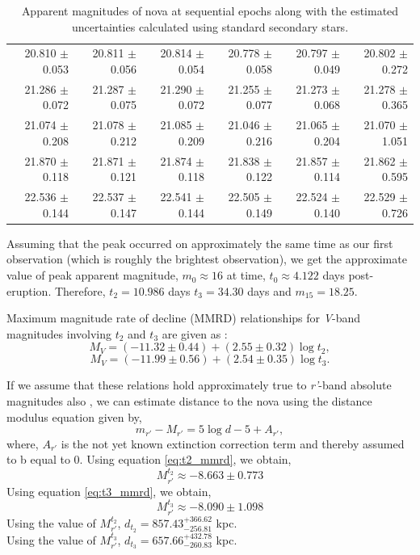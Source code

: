 \documentclass{tda}
\begin{document}
\begin{table}
\begin{tabular} {r r r r r r}
			20.810 \(\pm\) 0.053 & 20.811 \(\pm\) 0.056 & 20.814 \(\pm\) 0.054 & 20.778 \(\pm\) 0.058 & 20.797 \(\pm\) 0.049 & 20.802 \(\pm\) 0.272 \\
			21.286 \(\pm\) 0.072 & 21.287 \(\pm\) 0.075 & 21.290 \(\pm\) 0.072 & 21.255 \(\pm\) 0.077 & 21.273 \(\pm\) 0.068 & 21.278 \(\pm\) 0.365 \\
			21.074 \(\pm\) 0.208 & 21.078 \(\pm\) 0.212 & 21.085 \(\pm\) 0.209 & 21.046 \(\pm\) 0.216 & 21.065 \(\pm\) 0.204 & 21.070 \(\pm\) 1.051 \\
			21.870 \(\pm\) 0.118 & 21.871 \(\pm\) 0.121 & 21.874 \(\pm\) 0.118 & 21.838 \(\pm\) 0.122 & 21.857 \(\pm\) 0.114 & 21.862 \(\pm\) 0.595 \\
			22.536 \(\pm\) 0.144 & 22.537 \(\pm\) 0.147 & 22.541 \(\pm\) 0.144 & 22.505 \(\pm\) 0.149 & 22.524 \(\pm\) 0.140 & 22.529 \(\pm\) 0.726 \\
			\bottomrule
		\end{tabular}
		\caption{Apparent magnitudes of nova at sequential epochs along with the estimated uncertainties calculated using standard secondary stars.}
		\label{table:photometry_nova}
	\end{table}


	Assuming that the peak occurred on approximately the same time as our first observation (which is roughly the brightest observation), we get the approximate value of peak apparent magnitude, \(m_0 \approx 16\) at time, \(t_0 \approx 4.122\) days post-eruption.
	Therefore, \(t_2 = 10.986\) days \(t_3 = 34.30\) days and \(m_{15} = 18.25\).

	Maximum magnitude rate of decline (MMRD) relationships for \textit{V}-band magnitudes involving \(t_2\) and \(t_3\) are given as \citep{2000AJ....120.2007D}:
	\begin{equation}
		M_V = (-11.32 \pm 0.44) + (2.55 \pm 0.32) \log t_2 ,
		\label{eq:t2_mmrd}
	\end{equation}
	\begin{equation}
		M_V = (-11.99 \pm 0.56) + (2.54 \pm 0.35) \log t_3.
		\label{eq:t3_mmrd}
	\end{equation}

	If we assume that these relations hold approximately true to \textit{r'}-band absolute magnitudes also \citep{2006MNRAS.369..257D}, we can estimate distance to the nova using the distance modulus equation given by,
	\begin{equation}
		m_{r'} - M_{r'} = 5 \log d - 5 + A_{r'},
		\label{eq:distance_modulus}
	\end{equation}
	where, \(A_{r'}\) is the not yet known extinction correction term and thereby assumed to b equal to 0.
	Using equation \ref{eq:t2_mmrd}, we obtain,
	\[M_{r'}^{t_2} \approx -8.663 \pm 0.773 \] 
	Using equation \ref{eq:t3_mmrd}, we obtain,
	\[M_{r'}^{t_3} \approx -8.090 \pm 1.098\]
	Using the value of \(M_{r'}^{t_2}\), \(d_{t_2} = 857.43^{+366.62}_{-256.81} \) kpc. \\
	Using the value of \(M_{r'}^{t_3}\), \(d_{t_3} = 657.66^{+432.78}_{-260.83}\) kpc. \\
\end{document}
